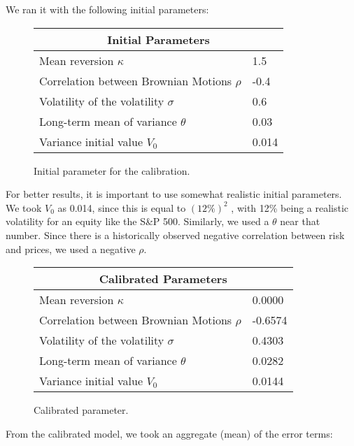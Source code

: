 \documentclass[fontsize=12pt]{article}
\numberwithin{equation}{section} %
\numberwithin{figure}{section} %
\numberwithin{table}{section} %
\begin{document}
We ran it with the following initial parameters:

\begin{figure}[H]
\centering
\begin{tabular}{| p{6.5cm}| p{2.0cm} |}
\hline
\multicolumn{2}{|c|}{Initial Parameters} \\
\hline
Mean reversion $\kappa$ & 1.5 \\ \hline
Correlation between Brownian Motions $\rho$ & -0.4 \\ \hline
Volatility of the volatility $\sigma$ & 0.6 \\ \hline
Long-term mean of variance $\theta$ & 0.03 \\ \hline
Variance initial value $V_0$ & 0.014 \\ \hline
\end{tabular}
\caption{Initial parameter for the calibration.}
\label{tabla:Initial Parameters Closed Form}
\end{figure}

For better results, it is important to use somewhat realistic initial parameters. We took $V_0$ as 0.014, since this is equal to ${(12\%)}^2$ , with 12\% being a realistic volatility for an equity like the S\&P 500. Similarly, we used a $\theta$ near that number. Since there is a historically observed negative correlation between risk and prices, we used a negative $\rho$.



\begin{figure}[H]
\centering
\begin{tabular}{| p{6.5cm}| p{2.0cm} |}
\hline
\multicolumn{2}{|c|}{Calibrated Parameters} \\
\hline
Mean reversion $\kappa$ & 0.0000 \\ \hline
Correlation between Brownian Motions $\rho$ & -0.6574 \\ \hline
Volatility of the volatility $\sigma$ & 0.4303 \\ \hline
Long-term mean of variance $\theta$ & 0.0282 \\ \hline
Variance initial value $V_0$ & 0.0144 \\ \hline
\end{tabular}
\caption{Calibrated parameter.}
\label{tabla:Calibrated Parameters Closed Form}
\end{figure}

From the calibrated model, we took an aggregate (mean) of the error terms:

\begin{center}
\end{center}
\end{document}
